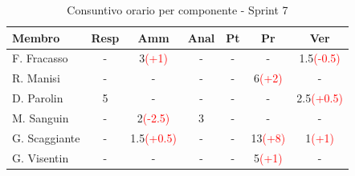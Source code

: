 \documentclass[a4paper,12pt]{article}
\begin{document}
\begin{table}[H]
    \centering
    \renewcommand{\arraystretch}{1.4}
    \footnotesize
    \begin{tabularx}{\textwidth}{|l|C|C|C|C|C|C|}
        \hline
        \textbf{Membro} & \textbf{Resp} & \textbf{Amm} & \textbf{Anal} & \textbf{Pt} & \textbf{Pr} & \textbf{Ver} \\
        \hline
        F. Fracasso & - & 3\textcolor{red}{(+1)} & - & - & - & 1.5\textcolor{red}{(-0.5)} \\
        \hline
        R. Manisi & - & - & - & - & 6\textcolor{red}{(+2)} & - \\
        \hline
        D. Parolin & 5 & - & - & - & - & 2.5\textcolor{red}{(+0.5)} \\
        \hline
        M. Sanguin & - & 2\textcolor{red}{(-2.5)} & 3 & - & - & - \\
        \hline
        G. Scaggiante & - & 1.5\textcolor{red}{(+0.5)} & - & - & 13\textcolor{red}{(+8)} & 1\textcolor{red}{(+1)} \\
        \hline
        G. Visentin & - & - & - & - & 5\textcolor{red}{(+1)} & - \\
        \hline
    \end{tabularx}
    \caption{Consuntivo orario per componente - Sprint 7}
    \label{tab:consuntivo_sprint7}
\end{table}
\end{document}
